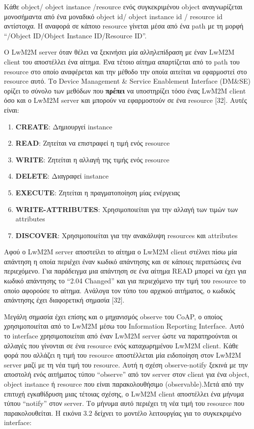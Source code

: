 Κάθε {object/ object instance /resource ενός συγκεκριμένου object} αναγνωρίζεται μονοσήμαντα από ένα μοναδικό {object id/ object instance id / resource id} αντίστοιχα. Η αναφορά σε κάποιο resource γίνεται μέσα από ένα path με τη μορφή “/{Object ID}/{Object Instance ID}/{Resource ID}”. 
	
Ο LwM2M server όταν θέλει να ξεκινήσει μία αλληλεπίδραση με έναν LwM2M client του αποστέλλει ένα αίτημα. Ένα τέτοιο αίτημα απαρτίζεται από το path του resource στο οποίο αναφέρεται και την μέθοδο την οποία αιτείται να εφαρμοστεί στο resource αυτό. 	Το Device Management \& Service Enablement Interface (DM\&SE) ορίζει το σύνολο των μεθόδων που \textbf{πρέπει} να υποστηρίζει τόσο ένας LwM2M client όσο και ο LwM2M server και μπορούν να εφαρμοστούν σε ένα resource [32]. Αυτές είναι:
	
\begin{enumerate}
	\item{\textbf{CREATE}: Δημιουργεί instance}
	\item{\textbf{READ}: Ζητείται να επιστραφεί η τιμή ενός resource}
	\item{\textbf{WRITE}: Ζητείται η αλλαγή της τιμής ενός resource}
	\item{\textbf{DELETE}: Διαγραφεί instance}
	\item{\textbf{EXECUTE}: Ζητείται η πραγματοποίηση μίας ενέργειας}
	\item{\textbf{WRITE-ATTRIBUTES}: Χρησιμοποιείται για την αλλαγή των τιμών των attributes}
	\item{\textbf{DISCOVER}: Χρησιμοποιείται για την ανακάλυψη resources και attributes}
\end{enumerate}

Αφού ο LwM2M server αποστείλει το αίτημα ο LwM2M client στέλνει πίσω μία απάντηση η οποία περιέχει έναν κωδικό απάντησης και σε κάποιες περιπτώσεις ένα περιεχόμενο. Για παράδειγμα μια απάντηση σε ένα αίτημα READ μπορεί να έχει για κωδικό απάντησης το “2.04 Changed” και για περιεχόμενο την τιμή του resource το οποίο αφορούσε το αίτημα. Ανάλογα τον τύπο του αρχικού αιτήματος, ο κωδικός απάντησης έχει διαφορετική σημασία [32].	

	Μεγάλη σημασία έχει επίσης και ο μηχανισμός observe του CoAP, ο οποίος χρησιμοποιείται από το LwM2M μέσω του Information Reporting Interface. Αυτό το interface χρησιμοποιείται από έναν LwM2M server ώστε να παρατηρούνται οι αλλαγές που γίνονται σε ένα resource ενός καταχωρημένου LwM2M client. Κάθε φορά που αλλάζει η τιμή του resource αποστέλλεται μία ειδοποίηση στον LwM2M server μαζί με τη νέα τιμή του resource. Αυτή η σχέση observe-notify ξεκινά με την αποστολή ενός αιτήματος τύπου “observe”  από τον server στον client για ένα object, object instance ή resource που είναι παρακολουθήσιμο (observable).Μετά από την επιτυχή εγκαθίδρυση μιας τέτοιας σχέσης, ο LwM2M client αποστέλλει ένα μήνυμα τύπου “notify” στον server. Το μήνυμα αυτό περιέχει τη νέα τιμή του resource που παρακολουθείται. Η εικόνα 3.2 δείχνει το μοντέλο λειτουργίας για το συγκεκριμένο interface:

